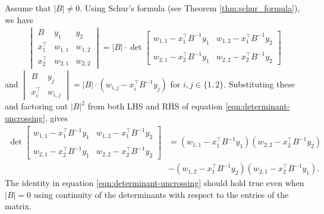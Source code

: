 \documentclass[11pt]{article}
\makeatletter
\theoremstyle{definition}
\newenvironment{proof}[1][\protect\proofname]{\par
	\normalfont\topsep6\p@\@plus6\p@\relax
	\trivlist
	\itemindent\parindent        %
	\item[\hskip\labelsep\scshape #1]\ignorespaces
}{%
	\endtrivlist\@endpefalse
}
\providecommand{\proofname}{Proof}
\makeatother
\begin{document}
\begin{proof}
	Assume that $|B|\neq 0$. Using Schur's formula (see Theorem \ref{thm:schur_formula}), we have 
	\begin{align*}
		\begin{vmatrix}
			B & y_1 & y_2 \\
			x_1^{\top}& w_{1,1} & w_{1,2}\\
			x_2^{\top}& w_{2,1} & w_{2,2}
		\end{vmatrix} =|B|\cdot \det\begin{bmatrix}
			w_{1,1}-x_1^{\top}B^{-1}y_1 & w_{1,2}-x_{1}^{\top}B^{-1}y_2\\
			\\
			w_{2,1}-x_2^{\top}B^{-1}y_1 & w_{2,2}-x_{2}^{\top}B^{-1}y_2
		\end{bmatrix}   
	\end{align*}
	and $\begin{vmatrix}
		B & y_j \\
		x_i^{\top}& w_{i,j}
	\end{vmatrix}=|B|\cdot(w_{i,j}-x_i^{\top}B^{-1}y_{j})$ for $i,j \in \{1,2\}$. Substituting these and factoring out $|B|^2$ from both LHS and RHS of equation \eqref{eqn:determinant-uncrossing}, gives
	\begin{align*}
		\det\begin{bmatrix}
			w_{1,1}-x_1^{\top}B^{-1}y_1 & w_{1,2}-x_{1}^{\top}B^{-1}y_2\\
			\\
			w_{2,1}-x_2^{\top}B^{-1}y_1 & w_{2,2}-x_{2}^{\top}B^{-1}y_2
		\end{bmatrix} &= ( w_{1,1}-x_1^{\top}B^{-1}y_1)(w_{2,2}-x_{2}^{\top}B^{-1}y_2) \\&-(w_{1,2}-x_{1}^{\top}B^{-1}y_2)(w_{2,1}-x_2^{\top}B^{-1}y_1).
	\end{align*}
    The identity in equation \eqref{eqn:determinant-uncrossing} should hold true even when $|B|=0$ using continuity of the determinants with respect to the entries of the matrix. 
\end{proof}
\end{document}

